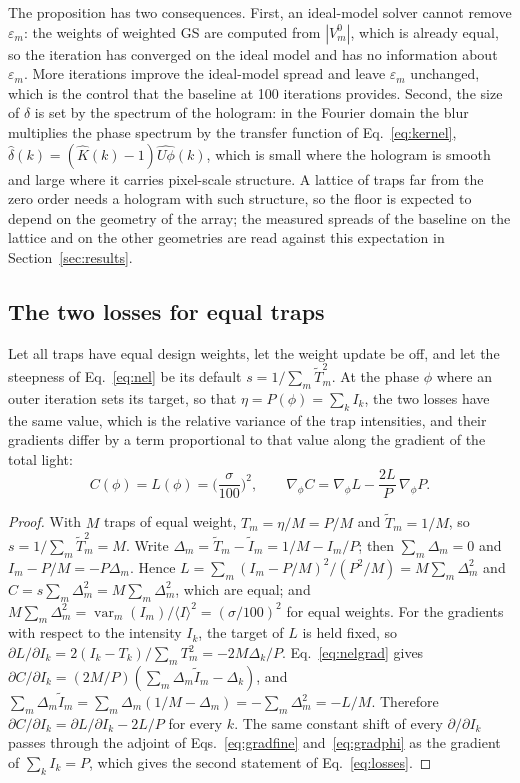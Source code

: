 The proposition has two consequences. First, an ideal-model solver cannot remove $\varepsilon_m$: the weights of weighted GS are computed from $|V_m^0|$, which is already equal, so the iteration has converged on the ideal model and has no information about $\varepsilon_m$. More iterations improve the ideal-model spread and leave $\varepsilon_m$ unchanged, which is the control that
the baseline at 100 iterations provides. Second, the size of $\delta$ is set by the spectrum of the hologram: in the Fourier domain the blur multiplies the phase spectrum by the transfer function of Eq.~\ref{eq:kernel}, $\hat\delta(k)=(\hat K(k)-1)\widehat{U\phi}(k)$, which is small where the hologram is smooth and large where it carries
pixel-scale structure. A lattice of traps far from the zero order needs a hologram with such structure, so the floor is expected to depend on the geometry of the array; the measured spreads of the baseline on the lattice and on the other geometries are read against this expectation in Section~\ref{sec:results}.

\subsection{The two losses for equal traps}

\begin{proposition}\label{prop:losses}
Let all traps have equal design weights, let the weight update be off, and let the steepness of Eq.~\ref{eq:nel} be its default $s=1/\sum_m\tilde T_m^2$. At the phase $\phi$ where an outer iteration sets its target, so that $\eta=P(\phi)=\sum_kI_k$, the two losses have the same value, which is the relative variance of the trap intensities, and their gradients differ by a term proportional to that value along the gradient of the total light:
\begin{equation}
C(\phi)=L(\phi)=\Big(\frac{\sigma}{100}\Big)^2,\qquad \nabla_\phi C=\nabla_\phi L-\frac{2L}{P}\,\nabla_\phi P.\label{eq:losses}
\end{equation}
\end{proposition}
\begin{proof}
With $M$ traps of equal weight, $T_m=\eta/M=P/M$ and $\tilde T_m=1/M$, so $s=1/\sum_m\tilde T_m^2=M$. Write $\Delta_m=\tilde T_m-\tilde I_m=1/M-I_m/P$; then $\sum_m\Delta_m=0$ and $I_m-P/M=-P\Delta_m$. Hence $L=\sum_m(I_m-P/M)^2/(P^2/M)=M\sum_m\Delta_m^2$ and $C=s\sum_m\Delta_m^2=M\sum_m\Delta_m^2$, which are equal; and $M\sum_m\Delta_m^2=\operatorname{var}_m(I_m)/\langle I\rangle^2=(\sigma/100)^2$ for equal weights. For the gradients with respect to the intensity $I_k$, the target of $L$ is held fixed, so $\partial L/\partial I_k=2(I_k-T_k)/\sum_mT_m^2=-2M\Delta_k/P$. Eq.~\ref{eq:nelgrad} gives $\partial C/\partial I_k=(2M/P)(\sum_m\Delta_m\tilde I_m-\Delta_k)$, and $\sum_m\Delta_m\tilde I_m=\sum_m\Delta_m(1/M-\Delta_m)=-\sum_m\Delta_m^2=-L/M$. Therefore $\partial C/\partial I_k=\partial L/\partial I_k-2L/P$ for every $k$. The same constant shift of every $\partial/\partial I_k$ passes through the adjoint of Eqs.~\ref{eq:gradfine} and~\ref{eq:gradphi} as the gradient of $\sum_kI_k=P$, which gives the second statement of Eq.~\ref{eq:losses}.
\end{proof}

